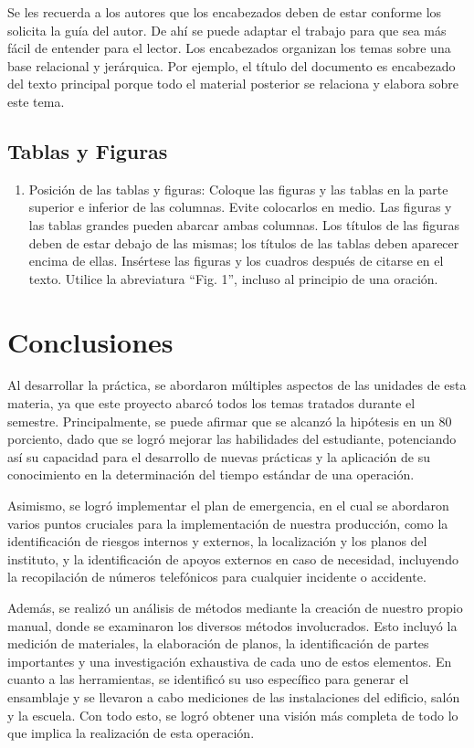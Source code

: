   Se les recuerda a los autores que los encabezados deben de estar conforme los solicita la guía del autor. De ahí se puede adaptar el trabajo para que sea más fácil de entender para el lector.
    Los encabezados organizan los temas sobre una base relacional y jerárquica. Por ejemplo, el título del documento es encabezado del texto principal porque todo el material posterior se relaciona y elabora sobre este tema. 
    
    \subsection{Tablas y Figuras}
    
    \begin{enumerate}
        \item Posición de las tablas y figuras: Coloque las figuras y las tablas en la parte superior e inferior de las columnas. Evite colocarlos en medio. Las figuras y las tablas grandes pueden abarcar ambas columnas. Los títulos de las figuras deben de estar debajo de las mismas; los títulos de las tablas deben aparecer encima de ellas. Insértese las figuras y los cuadros después de citarse en el texto. Utilice la abreviatura “Fig. 1”, incluso al principio de una oración. 
    \end{enumerate}
    
    \section{Conclusiones}
    
    Al desarrollar la práctica, se abordaron múltiples aspectos de las unidades de esta materia, ya que este proyecto abarcó todos los temas tratados durante el semestre. Principalmente, se puede afirmar que se alcanzó la hipótesis en un 80 porciento, dado que se logró mejorar las habilidades del estudiante, potenciando así su capacidad para el desarrollo de nuevas prácticas y la aplicación de su conocimiento en la determinación del tiempo estándar de una operación.
    
    Asimismo, se logró implementar el plan de emergencia, en el cual se abordaron varios puntos cruciales para la implementación de nuestra producción, como la identificación de riesgos internos y externos, la localización y los planos del instituto, y la identificación de apoyos externos en caso de necesidad, incluyendo la recopilación de números telefónicos para cualquier incidente o accidente.
    
    Además, se realizó un análisis de métodos mediante la creación de nuestro propio manual, donde se examinaron los diversos métodos involucrados. Esto incluyó la medición de materiales, la elaboración de planos, la identificación de partes importantes y una investigación exhaustiva de cada uno de estos elementos. En cuanto a las herramientas, se identificó su uso específico para generar el ensamblaje y se llevaron a cabo mediciones de las instalaciones del edificio, salón y la escuela. Con todo esto, se logró obtener una visión más completa de todo lo que implica la realización de esta operación.
    
